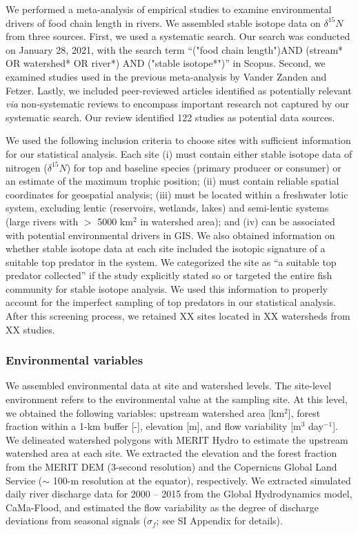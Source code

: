 \documentclass[11pt, class=article, crop=false]{standalone}
\begin{document}
We performed a meta-analysis of empirical studies to examine environmental drivers of food chain length in rivers.
We assembled stable isotope data on $\delta^{15} N$ from three sources.
First, we used a systematic search. 
Our search was conducted on January 28, 2021, with the search term ``("food chain length")AND (stream* OR watershed* OR river*) AND ("stable isotope*")'' in Scopus.
Second, we examined studies used in the previous meta-analysis by Vander Zanden and Fetzer.
Lastly, we included peer-reviewed articles identified as potentially relevant \textit{via} non-systematic reviews to encompass important research not captured by our systematic search.
Our review identified 122 studies as potential data sources.

We used the following inclusion criteria to choose sites with sufficient information for our statistical analysis.
Each site (i) must contain either stable isotope data of nitrogen ($\delta^{15}N$) for top and baseline species (primary producer or consumer) or an estimate of the maximum trophic position; 
(ii) must contain reliable spatial coordinates for geospatial analysis; 
(iii) must be located within a freshwater lotic system, excluding lentic (reservoirs, wetlands, lakes) and semi-lentic systems (large rivers with $>$ 5000 km$^2$ in watershed area); and (iv) can be associated with potential environmental drivers in GIS.
We also obtained information on whether stable isotope data at each site included the isotopic signature of a suitable top predator in the system.
We categorized the site as ``a suitable top predator collected'' if the study explicitly stated so or targeted the entire fish community for stable isotope analysis.
We used this information to properly account for the imperfect sampling of top predators in our statistical analysis.
After this screening process, we retained XX sites located in XX watersheds from XX studies. 

\subsubsection{Environmental variables}

We assembled environmental data at site and watershed levels.
The site-level environment refers to the environmental value at the sampling site.
At this level, we obtained the following variables: upstream watershed area [km$^2$], forest fraction within a 1-km buffer [-], elevation [m], and flow variability [m$^3$ day$^{-1}$].
We delineated watershed polygons with MERIT Hydro to estimate the upstream watershed area at each site.
We extracted the elevation and the forest fraction from the MERIT DEM (3-second resolution) and the Copernicus Global Land Service ($\sim$ 100-m resolution at the equator), respectively.
We extracted simulated daily river discharge data for 2000 -- 2015 from the Global Hydrodynamics model, CaMa-Flood, and estimated the flow variability as the degree of discharge deviations from seasonal signals ($\sigma_f$; see SI Appendix for details).
\end{document}
